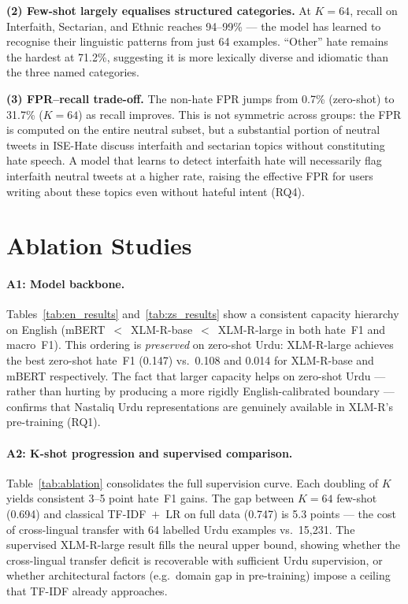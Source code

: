 \documentclass{article}
\begin{document}
\textbf{(2) Few-shot largely equalises structured categories.}
At $K=64$, recall on Interfaith, Sectarian, and Ethnic reaches
94--99\% --- the model has learned to recognise their linguistic patterns
from just 64 examples.
``Other'' hate remains the hardest at 71.2\%, suggesting it is more
lexically diverse and idiomatic than the three named categories.

\textbf{(3) FPR--recall trade-off.}
The non-hate FPR jumps from 0.7\% (zero-shot) to 31.7\% ($K=64$) as
recall improves.
This is not symmetric across groups: the FPR is computed on the entire
neutral subset, but a substantial portion of neutral tweets in ISE-Hate
discuss interfaith and sectarian topics without constituting hate speech.
A model that learns to detect interfaith hate will necessarily flag
interfaith neutral tweets at a higher rate, raising the effective FPR
for users writing about these topics even without hateful intent (RQ4).

\section{Ablation Studies}
\label{sec:ablation}

\paragraph{A1: Model backbone.}
Tables~\ref{tab:en_results} and~\ref{tab:zs_results} show a consistent
capacity hierarchy on English (mBERT~$<$~XLM-R-base~$<$~XLM-R-large in
both hate~F1 and macro~F1).
This ordering is \emph{preserved} on zero-shot Urdu: XLM-R-large achieves
the best zero-shot hate~F1 (0.147) vs.\ 0.108 and 0.014 for XLM-R-base
and mBERT respectively.
The fact that larger capacity helps on zero-shot Urdu --- rather than
hurting by producing a more rigidly English-calibrated boundary ---
confirms that Nastaliq Urdu representations are genuinely available in
XLM-R's pre-training (RQ1).

\paragraph{A2: K-shot progression and supervised comparison.}
Table~\ref{tab:ablation} consolidates the full supervision curve.
Each doubling of $K$ yields consistent 3--5 point hate~F1 gains.
The gap between $K=64$ few-shot (0.694) and classical TF-IDF~$+$~LR on
full data (0.747) is 5.3 points --- the cost of cross-lingual transfer
with 64 labelled Urdu examples vs.\ 15{,}231.
The supervised XLM-R-large result fills the neural upper bound,
showing whether the cross-lingual transfer deficit is recoverable
with sufficient Urdu supervision, or whether architectural factors
(e.g.\ domain gap in pre-training) impose a ceiling that TF-IDF already
approaches.
\end{document}
